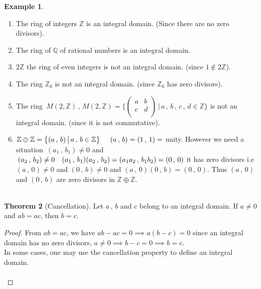 \documentclass[11pt,a4paper]{article}
\theoremstyle{definition}
\newtheorem{thm}{Theorem}[subsection]
\newtheorem{exa}[thm]{Example}
\begin{document}
\begin{exa}
\begin{enumerate}
\item The ring of integers $\mathbb{Z}$ is an integral domain. (Since there are no zero divisors).
\item The ring of $\mathbb{Q}$ of rational numbers is an integral domain.
\item $2\mathbb{Z}$ the ring of even integers is not an integral domain. (since $1\not\in 2\mathbb{Z}$).
\item The ring $\mathbb{Z}_6$ is not an integral domain. (since $\mathbb{Z}_6$ has zero divisors). 
\item The ring $\, M(2,\mathbb{Z})\, ,  \, M(2,\mathbb{Z}) = \Big\{\begin{pmatrix}
a & b\\
c & d\\
\end{pmatrix}\, \Big|\, a\, , \, b\, , \, c\, , \, d\in \mathbb{Z}\Big\}$ is not an integral domain. (since it is not commutative).
\item $\mathbb{Z}\oplus \mathbb{Z}  = \big\{(a\, , \, b)\, \big|\, a\, , \, b\in \mathbb{Z}\big\}\hspace{0.5cm} (a\, , \, b) = (1\, , \, 1) = $ unity. However we need a situation $\, (a_1\, , \, b_1) \neq 0$ and $\, (a_2\, , \, b_2)\neq 0\, \hspace{0.3cm} (a_1\, , \, b_1)(a_2\,, \, b_2) = (a_1a_2\, , \, b_1b_2) = (0\, , \, 0)$ it has zero divisors i.e $(a\, , \, 0) \neq 0$ and $(0\, , \, b) \neq 0$ and $(a\, ,\, 0)(0\, , \, b) = (0\, , \, 0)$. Thus $(a\, , \, 0)$ and $(0\,, \, b)$ are zero divisors in $\mathbb{Z}\oplus \mathbb{Z}$.\\\\
\end{enumerate}
\end{exa}







\begin{thm}[Cancellation]
Let $a\, , \, b $ and $c$ belong to an integral domain. If $a\neq 0$ and $ab = ac$, then $b  = c$.\\
\end{thm}


\begin{proof}
From $ab = ac$, we have $ab - ac = 0 \implies  a (b - c) = 0$ since an integral domain has no zero divisors, $a\neq 0\implies b - c = 0 \implies b = c$.\\
 In some cases, one may use the cancellation property to define an integral domain.\\\\
\end{proof}
 
\end{document}
